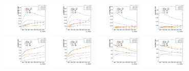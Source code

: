 \begin{figure}[htbp]
  \centering
  \includegraphics[width=0.2\textwidth]{fig/analysisAppendix/paramSignalYield_NonVBFSig_mu_HP_bb_LDy.pdf}
  \includegraphics[width=0.2\textwidth]{fig/analysisAppendix/paramSignalYield_NonVBFSig_e_HP_bb_LDy.pdf}
  \includegraphics[width=0.2\textwidth]{fig/analysisAppendix/paramSignalYield_NonVBFSig_mu_LP_bb_LDy.pdf}
  \includegraphics[width=0.2\textwidth]{fig/analysisAppendix/paramSignalYield_NonVBFSig_e_LP_bb_LDy.pdf}\\
  \includegraphics[width=0.2\textwidth]{fig/analysisAppendix/paramSignalYield_NonVBFSig_mu_HP_nobb_LDy.pdf}
  \includegraphics[width=0.2\textwidth]{fig/analysisAppendix/paramSignalYield_NonVBFSig_e_HP_nobb_LDy.pdf}
  \includegraphics[width=0.2\textwidth]{fig/analysisAppendix/paramSignalYield_NonVBFSig_mu_LP_nobb_LDy.pdf}
  \includegraphics[width=0.2\textwidth]{fig/analysisAppendix/paramSignalYield_NonVBFSig_e_LP_nobb_LDy.pdf}\\

\end{figure}
